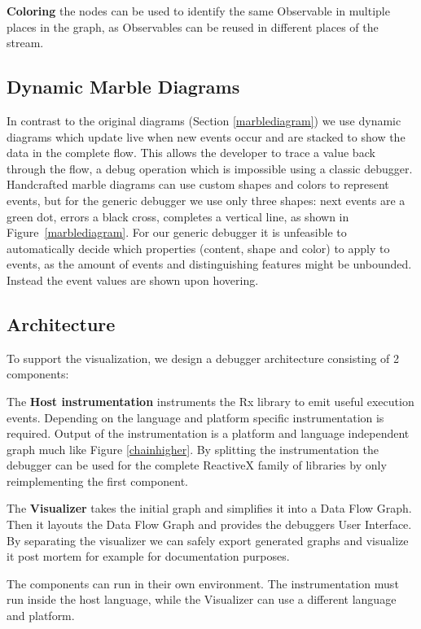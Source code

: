 \textbf{Coloring} the nodes can be used to identify the same Observable in multiple places in the graph, as Observables can be reused in different places of the stream.

\subsection{Dynamic Marble Diagrams}
In contrast to the original diagrams (Section \ref{marblediagram}) we use dynamic diagrams which update live when new events occur and are stacked to show the data in the complete flow. This allows the developer to trace a value back through the flow, a debug operation which is impossible using a classic debugger. Handcrafted marble diagrams can use custom shapes and colors to represent events, but for the generic debugger we use only three shapes: next events are a green dot, errors a black cross, completes a vertical line, as shown in Figure~\ref{marblediagram}. For our generic debugger it is unfeasible to automatically decide which properties (content, shape and color) to apply to events, as the amount of events and distinguishing features might be unbounded. Instead the event values are shown upon hovering.

\subsection{Architecture}
To support the visualization, we design a debugger architecture consisting of 2 components:

The \textbf{Host instrumentation} instruments the Rx library to emit useful execution events. Depending on the language and platform specific instrumentation is required. Output of the instrumentation is a platform and language independent graph much like Figure \ref{chainhigher}. By splitting the instrumentation the debugger can be used for the complete ReactiveX family of libraries by only reimplementing the first component. 

The \textbf{Visualizer} takes the initial graph and simplifies it into a Data Flow Graph. Then it layouts the Data Flow Graph and provides the debuggers User Interface. By separating the visualizer we can safely export generated graphs and visualize it post mortem for example for documentation purposes.

The components can run in their own environment. The instrumentation must run inside the host language, while the Visualizer can use a different language and platform.

